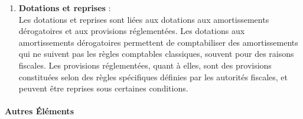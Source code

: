 \documentclass[a4paper, 12pt]{report}
\begin{document}
\begin{enumerate}
	\item \textbf{Dotations et reprises} :\\
	Les dotations et reprises sont liées aux dotations aux amortissements dérogatoires et aux provisions réglementées. Les dotations aux amortissements dérogatoires permettent de comptabiliser des amortissements qui ne suivent pas les règles comptables classiques, souvent pour des raisons fiscales. Les provisions réglementées, quant à elles, sont des provisions constituées selon des règles spécifiques définies par les autorités fiscales, et peuvent être reprises sous certaines conditions.
\end{enumerate}

\paragraph{Autres Éléments}
\end{document}
